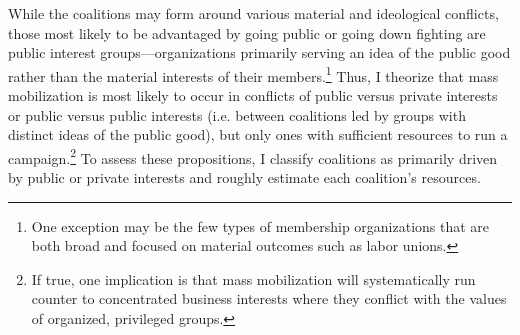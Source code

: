 
While the coalitions may form around various material and ideological conflicts, those most likely to be advantaged by going public or going down fighting are public interest groups---organizations primarily serving an idea of the public good rather than the material interests of their members.\footnote{
One exception may be the few types of membership organizations that are both broad and focused on material outcomes such as labor unions.} Thus, I theorize that mass mobilization is most likely to occur in conflicts of public versus private interests or public versus public interests (i.e. between coalitions led by groups with distinct ideas of the public good), but only ones with sufficient resources to run a campaign.\footnote{
If true, one implication is that mass mobilization will systematically run counter to concentrated business interests where they conflict with the values of organized, privileged groups.
}
To assess these propositions, I classify coalitions as primarily driven by public or private interests and roughly estimate each coalition's resources. 







